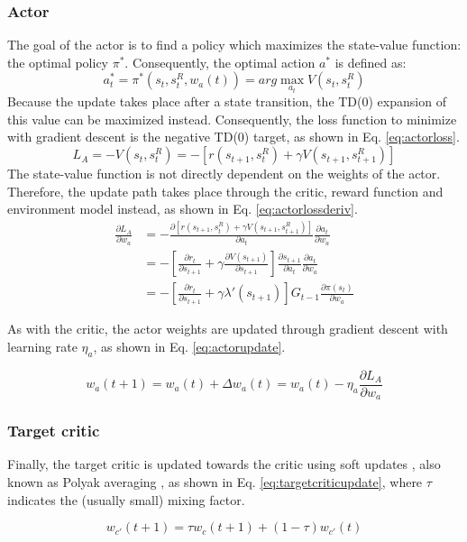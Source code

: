 \subsubsection{Actor}
The goal of the actor is to find a policy which maximizes the state-value function: the optimal policy $\pi^*$. Consequently, the optimal action $a^*$ is defined as:
\begin{equation} \label{eq:optimalpolicy}
    a^*_t = \pi^*(s_t, s^R_t, w_a(t)) = arg \max_{a_t} V(s_t, s^R_t)
\end{equation}
Because the update takes place after a state transition, the TD(0) expansion of this value can be maximized instead. Consequently, the loss function to minimize with gradient descent is the negative TD(0) target, as shown in Eq. \eqref{eq:actorloss}.
\begin{equation} \label{eq:actorloss}
    L_A = -V(s_t, s^R_t) = -\left[ r(s_{t+1}, s^R_t) + \gamma V(s_{t+1}, s^R_{t+1}) \right]
\end{equation}
The state-value function is not directly dependent on the weights of the actor. Therefore, the update path takes place through the critic, reward function and environment model instead, as shown in Eq. \eqref{eq:actorlossderiv}.
\begin{equation} \label{eq:actorlossderiv}
\begin{split}
    \frac{\partial L_A}{\partial w_a} &= -\frac{\partial \left[ r(s_{t+1}, s^R_t) + \gamma V(s_{t+1}, s^R_{t+1}) \right]}{\partial a_t}\frac{\partial a_t}{\partial w_a } \\
    &= -\left[ \frac{\partial r_t}{\partial s_{t+1} } + \gamma \frac{\partial V(s_{t+1})}{\partial s_{t+1} } \right] \frac{\partial s_{t+1}}{\partial a_t } \frac{\partial a_t}{\partial w_a } \\
    &= -\left[ \frac{\partial r_t}{\partial s_{t+1} } + \gamma \lambda'(s_{t+1}) \right] G_{t-1} \frac{\partial \pi(s_t)}{\partial w_a }
\end{split}
\end{equation}

As with the critic, the actor weights are updated through gradient descent with learning rate $\eta_a$, as shown in Eq. \eqref{eq:actorupdate}.

\begin{equation} \label{eq:actorupdate}
    w_a(t+1) = w_a(t) + \Delta w_a(t) = w_a(t) - \eta_a \frac{\partial L_A}{\partial w_a}
\end{equation}

\subsubsection{Target critic}
Finally, the target critic is updated towards the critic using soft updates \cite{Lillicrap2015}, also known as Polyak averaging \cite{Lee2019}, as shown in Eq. \eqref{eq:targetcriticupdate}, where $\tau$ indicates the (usually small) mixing factor. 

\begin{equation} \label{eq:targetcriticupdate}
    w_{c'}(t+1) = \tau w_{c}(t+1) + (1-\tau) w_{c'}(t)
\end{equation}

